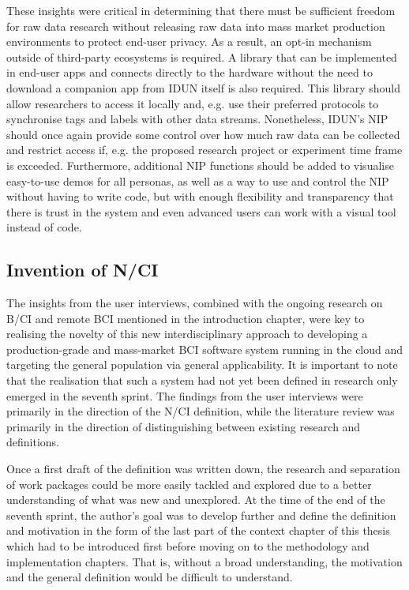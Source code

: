 These insights were critical in determining that there must be sufficient freedom for raw data research without releasing raw data into mass market production environments to protect end-user privacy. As a result, an opt-in mechanism outside of third-party ecosystems is required. A library that can be implemented in end-user apps and connects directly to the hardware without the need to download a companion app from IDUN itself is also required. This library should allow researchers to access it locally and, e.g. use their preferred protocols to synchronise tags and labels with other data streams. Nonetheless, IDUN's NIP should once again provide some control over how much raw data can be collected and restrict access if, e.g. the proposed research project or experiment time frame is exceeded. Furthermore, additional NIP functions should be added to visualise easy-to-use demos for all personas, as well as a way to use and control the NIP without having to write code, but with enough flexibility and transparency that there is trust in the system and even advanced users can work with a visual tool instead of code.

\subsection{Invention of N/CI}
\label{chapter4-invention-of-nci}

The insights from the user interviews, combined with the ongoing research on B/CI and remote BCI mentioned in the introduction chapter, were key to realising the novelty of this new interdisciplinary approach to developing a production-grade and mass-market BCI software system running in the cloud and targeting the general population via general applicability. It is important to note that the realisation that such a system had not yet been defined in research only emerged in the seventh sprint. The findings from the user interviews were primarily in the direction of the N/CI definition, while the literature review was primarily in the direction of distinguishing between existing research and definitions.

Once a first draft of the definition was written down, the research and separation of work packages could be more easily tackled and explored due to a better understanding of what was new and unexplored. At the time of the end of the seventh sprint, the author's goal was to develop further and define the definition and motivation in the form of the last part of the context chapter of this thesis which had to be introduced first before moving on to the methodology and implementation chapters. That is, without a broad understanding, the motivation and the general definition would be difficult to understand.

